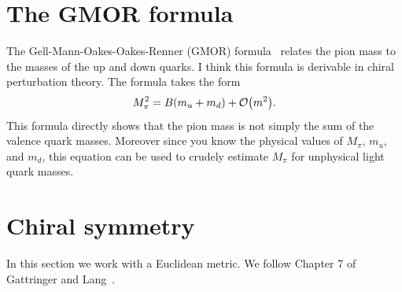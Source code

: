 \section{The GMOR formula}

The Gell-Mann-Oakes-Oakes-Renner (GMOR) formula~\cite{gell-mann_behavior_1968}
relates the pion mass to the masses of the up and down quarks. I think
this formula is derivable in chiral perturbation theory. The formula
takes the form
\begin{equation}
  M_\pi^2= B(m_u+m_d)+\order{m^2}.
\end{equation}
This formula directly shows that the pion mass is not simply the sum of
the valence quark masses. Moreover since you know the physical values
of $M_\pi$, $m_u$, and $m_d$, this equation can be used to crudely estimate
$M_\pi$ for unphysical light quark masses.




\section{Chiral symmetry}\label{sec:cscont}


In this section we work with a Euclidean metric. We follow
Chapter 7 of Gattringer and
Lang~\cite{gattringer_quantum_2010}.

